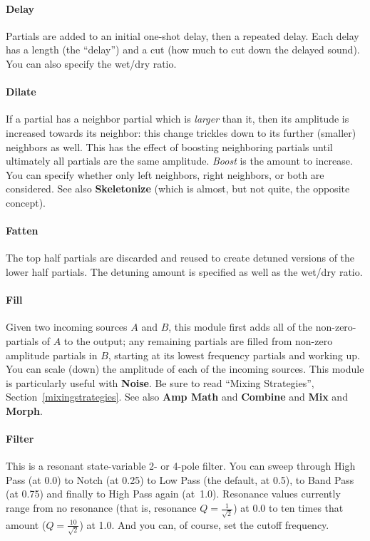 \documentclass{article}
\begin{document}
\paragraph{Delay}  Partials are added to an initial one-shot delay, then a repeated delay.  Each delay has a length (the ``delay'') and a cut (how much to cut down the delayed sound).  You can also specify the wet/dry ratio.

\paragraph{Dilate} If a partial has a neighbor partial which is {\it larger} than it, then its amplitude is increased towards its neighbor: this change trickles down to its further (smaller) neighbors as well.  This has the effect of boosting neighboring partials until ultimately all partials are the same amplitude.  {\it Boost} is the amount to increase.  You can specify whether only left neighbors, right neighbors, or both are considered.  See also {\bf Skeletonize} (which is almost, but not quite, the opposite concept).

\paragraph{Fatten}  The top half partials are discarded and reused to create detuned versions of the lower half partials.  The detuning amount is specified as well as the wet/dry ratio.

\paragraph{Fill}  Given two incoming sources \(A\) and \(B\), this module first adds all of the non-zero-partials of \(A\) to the output; any remaining partials are filled from non-zero amplitude partials in \(B\), starting at its lowest frequency partials and working up.  You can scale (down) the amplitude of each of the incoming sources.  This module is particularly useful with {\bf Noise}.  Be sure to read ``Mixing Strategies'', Section~\ref{mixingstrategies}.  See also {\bf Amp Math} and {\bf Combine} and {\bf Mix} and {\bf Morph}.

\paragraph{Filter}  This is a resonant state-variable 2- or 4-pole filter. You can sweep through High Pass (at 0.0) to Notch (at 0.25) to Low Pass (the default, at 0.5), to Band Pass (at 0.75) and finally to High Pass again (at~1.0).  Resonance values currently range from no resonance (that is, resonance \(Q=\frac{1}{\sqrt{2}}\)) at 0.0 to ten times that amount (\(Q =\frac{10}{\sqrt{2}}\))  at 1.0.  And you can, of course, set the cutoff frequency.
\end{document}
